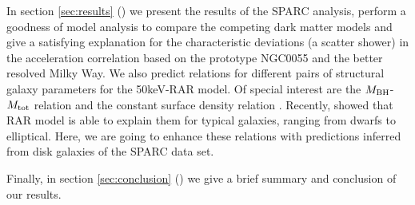In section \ref{sec:results} () we present the results of the SPARC analysis, perform a goodness of model analysis to compare the competing dark matter models and give a satisfying explanation for the characteristic deviations (a scatter shower) in the acceleration correlation based on the prototype NGC0055 and the better resolved Milky Way. We also predict relations for different pairs of structural galaxy parameters for the 50keV-RAR model. Of special interest are the $M_{\rm BH}$-$M_{\rm tot}$ relation \citep{2002ApJ...578...90F,2011Natur.469..377K,2015ApJ...800..124B} and the constant surface density relation \citep{2009MNRAS.397.1169D}. Recently, \citet{arguelles_novel_2018} showed that RAR model is able to explain them for typical galaxies, ranging from dwarfs to elliptical. Here, we are going to enhance these relations with predictions inferred from disk galaxies of the SPARC data set.

Finally, in section \ref{sec:conclusion} () we give a brief summary and conclusion of our results.